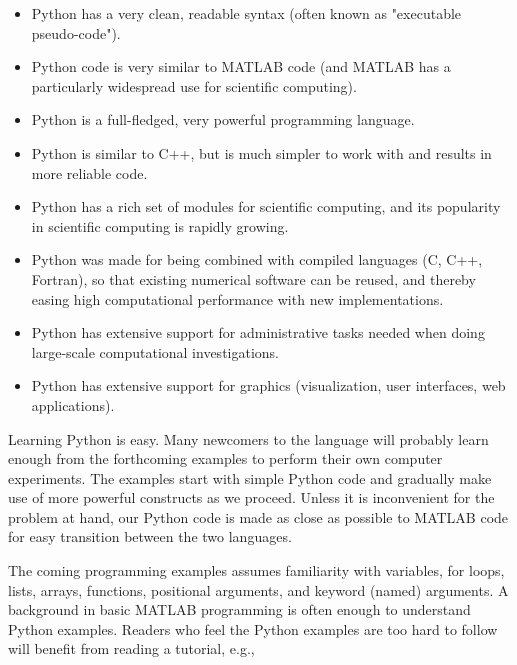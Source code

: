 \documentclass[graybox,sectrefs,envcountresetchap,open=right,final]{svmonodo}
\begin{document}
\begin{itemize}
  \item Python has a very clean, readable syntax (often known as
    "executable pseudo-code").

  \item Python code is very similar to MATLAB code (and MATLAB has a
    particularly widespread use for scientific computing).

  \item Python is a full-fledged, very powerful programming language.

  \item Python is similar to C++, but is much simpler to work with and
    results in more reliable code.

  \item Python has a rich set of modules for scientific computing, and its
    popularity in scientific computing is rapidly growing.

  \item Python was made for being combined with compiled languages
    (C, C++, Fortran), so that existing numerical software can be reused,
    and thereby easing high computational performance with new implementations.

  \item Python has extensive support for administrative tasks
    needed when doing large-scale computational investigations.

  \item Python has extensive support for graphics (visualization,
    user interfaces, web applications).
\end{itemize}

\noindent
Learning Python is easy. Many newcomers to the language will probably
learn enough from the forthcoming examples to perform their own computer
experiments. The examples start with simple Python code and gradually
make use of more powerful constructs as we proceed. Unless it is
inconvenient for the problem at hand, our Python code is made as
close as possible to MATLAB code for easy transition between the two
languages.

The coming programming examples assumes familiarity with
variables, for loops, lists, arrays,
functions, positional arguments, and keyword (named) arguments.
A background in basic MATLAB programming is often enough to understand
Python examples.
Readers who feel the Python examples are too hard to follow will
benefit from reading a tutorial, e.g.,
\end{document}
